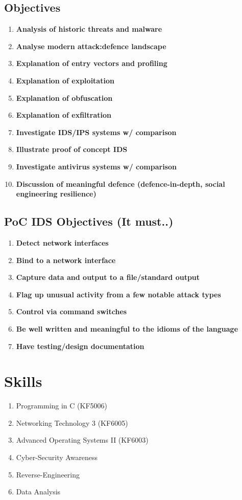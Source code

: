 \subsection{Objectives}
\begin{enumerate}
	\item \textbf{Analysis of historic threats and malware}
	\item \textbf{Analyse modern attack:defence landscape}
	\item \textbf{Explanation of entry vectors and profiling}
	\item \textbf{Explanation of exploitation}
	\item \textbf{Explanation of obfuscation}
	\item \textbf{Explanation of exfiltration}
	\item \textbf{Investigate IDS/IPS systems w/ comparison}
	\item \textbf{Illustrate proof of concept IDS}
	\item \textbf{Investigate antivirus systems w/ comparison}
	\item \textbf{Discussion of meaningful defence (defence-in-depth, social engineering resilience)}
\end{enumerate}

\subsection{PoC IDS Objectives (It must..)}
\begin{enumerate}
	\item \textbf{Detect network interfaces}
	\item \textbf{Bind to a network interface}
	\item \textbf{Capture data and output to a file/standard output}
	\item \textbf{Flag up unusual activity from a few notable attack types}
	\item \textbf{Control via command switches}
	\item \textbf{Be well written and meaningful to the idioms of the language}
	\item \textbf{Have testing/design documentation}
	
\end{enumerate}

\section{Skills}
\begin{enumerate}
	\item Programming in C (KF5006)
	\item Networking Technology 3 (KF6005)
	\item Advanced Operating Systems II (KF6003)
	\item Cyber-Security Awareness
	\item Reverse-Engineering
	\item Data Analysis
\end{enumerate}

